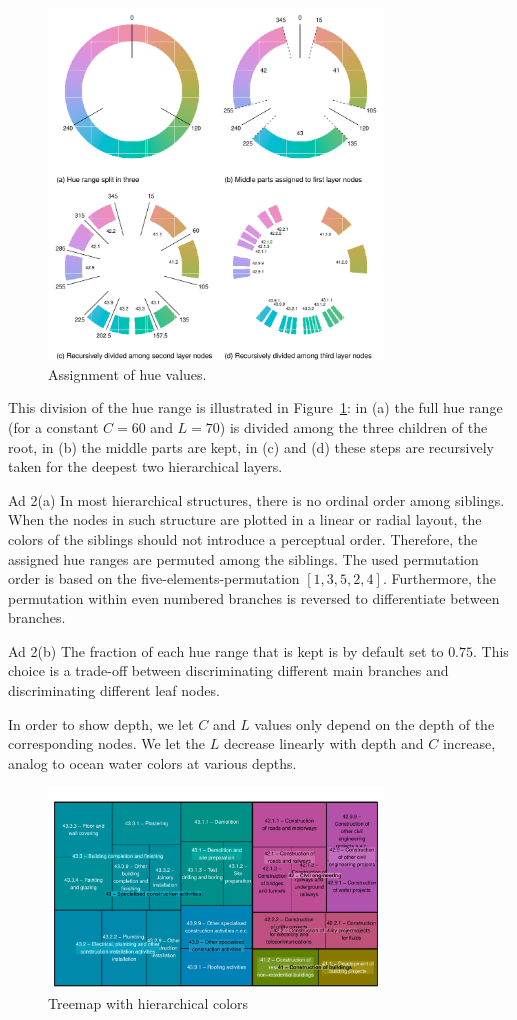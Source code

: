 \documentclass[review]{vgtc}                 %
\begin{document}
\begin{figure}[htb]
  \centering
  \includegraphics[width=3.5in]{hcl_method.pdf}
  \caption{Assignment of hue values.}\label{fig:wheel}
\end{figure}

This division of the hue range is illustrated in Figure~\ref{fig:wheel}: in (a) the full hue range (for a constant $C=60$ and $L=70$)  is divided among the three children of the root, in (b) the middle parts are kept, in (c) and (d) these steps are recursively taken for the deepest two hierarchical layers.

Ad 2(a) In most hierarchical structures, there is no ordinal order among siblings. When the nodes in such structure are plotted in a linear or radial layout, the colors of the siblings should not introduce a perceptual order. Therefore, the assigned hue ranges are permuted among the siblings. The used permutation order is based on the five-elements-permutation $[1, 3, 5, 2, 4]$. Furthermore, the permutation within even numbered branches is reversed to differentiate between branches. 

Ad 2(b) The fraction of each hue range that is kept is by default set to $0.75$. This choice is a trade-off between discriminating different main branches and discriminating different leaf nodes. 

In order to show depth, we let $C$ and $L$ values only depend on the depth of the corresponding nodes. We let the $L$ decrease linearly with depth and $C$ increase, analog to ocean water colors at various depths.

\begin{figure}[htb]
  \centering
  \includegraphics[width=3.5in]{treemap_F.pdf}
  \caption{Treemap with hierarchical colors}\label{fig:treemapF}
\end{figure}
\end{document}
